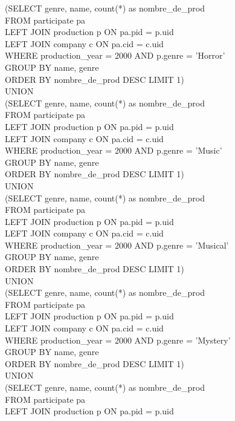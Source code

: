 \documentclass{article}
\begin{document}
(SELECT genre, name, count(*) as nombre_de_prod\\
FROM participate pa\\
LEFT JOIN production p ON pa.pid = p.uid\\
LEFT JOIN company c ON pa.cid = c.uid\\
WHERE production_year = 2000 AND p.genre = 'Horror'\\  
GROUP BY name, genre\\
ORDER BY nombre_de_prod DESC LIMIT 1)\\
UNION\\
(SELECT genre, name, count(*) as nombre_de_prod\\
FROM participate pa\\
LEFT JOIN production p ON pa.pid = p.uid\\
LEFT JOIN company c ON pa.cid = c.uid\\
WHERE production_year = 2000 AND p.genre = 'Music'  \\
GROUP BY name, genre\\
ORDER BY nombre_de_prod DESC LIMIT 1)\\
UNION\\
(SELECT genre, name, count(*) as nombre_de_prod\\
FROM participate pa\\
LEFT JOIN production p ON pa.pid = p.uid\\
LEFT JOIN company c ON pa.cid = c.uid\\
WHERE production_year = 2000 AND p.genre = 'Musical' \\ 
GROUP BY name, genre\\
ORDER BY nombre_de_prod DESC LIMIT 1)\\
UNION \\
(SELECT genre, name, count(*) as nombre_de_prod\\
FROM participate pa\\
LEFT JOIN production p ON pa.pid = p.uid\\
LEFT JOIN company c ON pa.cid = c.uid\\
WHERE production_year = 2000 AND p.genre = 'Mystery'  \\
GROUP BY name, genre\\
ORDER BY nombre_de_prod DESC LIMIT 1)\\
UNION\\
(SELECT genre, name, count(*) as nombre_de_prod\\
FROM participate pa\\
LEFT JOIN production p ON pa.pid = p.uid\\
\end{document}
